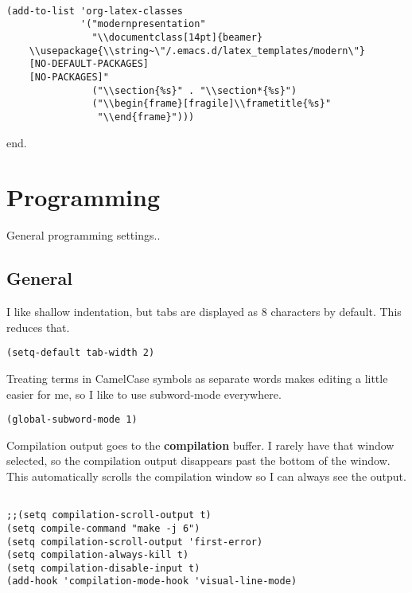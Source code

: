 \documentclass[12pt]{article}
\begin{document}
\begin{verbatim}

(add-to-list 'org-latex-classes
             '("modernpresentation"
               "\\documentclass[14pt]{beamer}
    \\usepackage{\\string~\"/.emacs.d/latex_templates/modern\"}
    [NO-DEFAULT-PACKAGES]
    [NO-PACKAGES]"
               ("\\section{%s}" . "\\section*{%s}")
               ("\\begin{frame}[fragile]\\frametitle{%s}"
                "\\end{frame}")))

\end{verbatim}
end.

\section{Programming}
\label{sec:org4f9a0b7}

General programming settings..

\subsection{General}
\label{sec:orgbffdeac}

I like shallow indentation, but tabs are displayed as 8 characters by default. This reduces that.

\begin{verbatim}
(setq-default tab-width 2)
\end{verbatim}

Treating terms in CamelCase symbols as separate words makes editing a little
easier for me, so I like to use subword-mode everywhere.
\begin{verbatim}
(global-subword-mode 1)
\end{verbatim}

Compilation output goes to the \textbf{compilation} buffer. I rarely have that window
selected, so the compilation output disappears past the bottom of the window.
This automatically scrolls the compilation window so I can always see the
output.

\begin{verbatim}

;;(setq compilation-scroll-output t)
(setq compile-command "make -j 6")
(setq compilation-scroll-output 'first-error)
(setq compilation-always-kill t)
(setq compilation-disable-input t)
(add-hook 'compilation-mode-hook 'visual-line-mode)

\end{verbatim}
\end{document}
